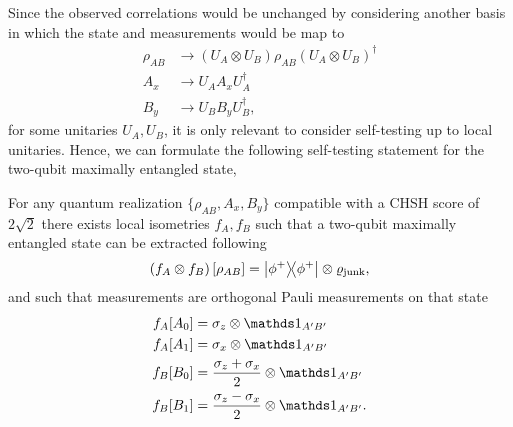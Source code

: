 Since the observed correlations would be unchanged by considering another basis in which the state and measurements would be map to
\begin{equation}
	\begin{split}
		\rho_{AB} &\rightarrow \left(U_A \otimes U_B\right)\rho_{AB}\left(U_A \otimes U_B\right)^\dag \\
		A_x &\rightarrow U_A A_x U_A^\dag \\
		B_y &\rightarrow U_B B_y U_B^\dag ,
	\end{split}	
\end{equation}
for some unitaries $U_A,U_B$, it is only relevant to consider self-testing up to local unitaries.
Hence, we can formulate the following self-testing statement for the two-qubit maximally entangled state,
\begin{theorem}
	For any quantum realization $\{\rho_{AB},A_x,B_y\}$ compatible with a CHSH score of $2\sqrt{2}$ there exists local isometries $f_A,f_B$ such that a two-qubit maximally entangled state can be extracted following
	\begin{displaymath}
		\left(f_A \otimes f_B\right) [\rho_{AB}] = \ketbra{\phi^+} \otimes \varrho_\text{junk},
	\end{displaymath}
	and such that measurements are orthogonal Pauli measurements on that state
	\begin{equation}
		\nonumber
		\begin{split}
			f_A [A_0] &= \sigma_z \otimes \id_{A'B'} \\
			f_A [A_1] &= \sigma_x \otimes \id_{A'B'} \\
			f_B [B_0] &= \frac{\sigma_z+\sigma_x}{2} \otimes \id_{A'B'} \\
			f_B [B_1] &= \frac{\sigma_z-\sigma_x}{2} \otimes \id_{A'B'}. 
		\end{split}
	\end{equation}
\end{theorem}



